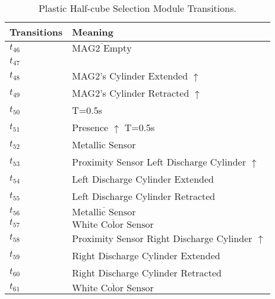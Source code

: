 \begin{table}[H]
\caption{Plastic Half-cube Selection Module Transitions.}
\centering
\begin{tabular}{M{5cm}M{10cm}}
Transitions & Meaning\\
\hline
\hyperlink{partialNet:t461}{\hypertarget{partialTable:t46}{$t_{46}$}} & \(\overline{\mbox{MAG2 Empty}}\)\\
\hyperlink{partialNet:t471}{\hypertarget{partialTable:t47}{$t_{47}$}} & \\
\hyperlink{partialNet:t481}{\hypertarget{partialTable:t48}{$t_{48}$}} & MAG2's Cylinder Extended \(\uparrow\)\\
\hyperlink{partialNet:t491}{\hypertarget{partialTable:t49}{$t_{49}$}} & MAG2's Cylinder Retracted \(\uparrow\)\\
\hyperlink{partialNet:tt501}{\hypertarget{partialTable:tt50}{$t_{50}$}} & T=0.5s\\
\hyperlink{partialNet:tt511}{\hypertarget{partialTable:tt51}{$t_{51}$}} & Presence \(\uparrow\) T=0.5s\\
\hyperlink{partialNet:t521}{\hypertarget{partialTable:t52}{$t_{52}$}} & Metallic Sensor\\
\hyperlink{partialNet:t531}{\hypertarget{partialTable:t53}{$t_{53}$}} & Proximity Sensor Left Discharge Cylinder \(\uparrow\)\\
\hyperlink{partialNet:t541}{\hypertarget{partialTable:t54}{$t_{54}$}} & Left Discharge Cylinder Extended\\
\hyperlink{partialNet:t551}{\hypertarget{partialTable:t55}{$t_{55}$}} & Left Discharge Cylinder Retracted\\
\hyperlink{partialNet:t561}{\hypertarget{partialTable:t56}{$t_{56}$}} & \(\overline{\mbox{Metallic Sensor}}\)\\
\hyperlink{partialNet:t571}{\hypertarget{partialTable:t57}{$t_{57}$}} & \(\overline{\mbox{White Color Sensor}}\)\\
\hyperlink{partialNet:t581}{\hypertarget{partialTable:t58}{$t_{58}$}} & Proximity Sensor Right Discharge Cylinder \(\uparrow\)\\
\hyperlink{partialNet:t591}{\hypertarget{partialTable:t59}{$t_{59}$}} & Right Discharge Cylinder Extended\\
\hyperlink{partialNet:t601}{\hypertarget{partialTable:t60}{$t_{60}$}} & Right Discharge Cylinder Retracted\\
\hyperlink{partialNet:t611}{\hypertarget{partialTable:t61}{$t_{61}$}} & \(\overline{\mbox{White Color Sensor}}\)\\

\end{tabular}
\end{table}
